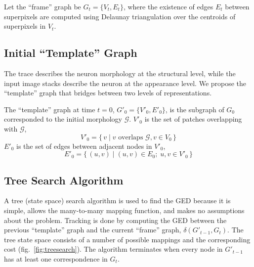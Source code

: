 \documentclass{article}
\begin{document}
Let the ``frame'' graph be $G_t = \{ V_t, E_t \}$, where the existence of edges $E_t$ between superpixels are computed using Delaunay triangulation over the centroids of superpixels in $V_t$.


\subsection{Initial ``Template'' Graph}
The trace describes the neuron morphology at the structural level, while the input image stacks describe the neuron at the appearance level. We propose the ``template'' graph that bridges between two levels of representations.

The ``template'' graph at time $t=0$, $G'_0 =  \{V'_0, E'_0 \}$, is the subgraph of $G_0$ corresponded to the initial morphology $\mathcal{G}$. $V'_0$ is the set of patches overlapping with $\mathcal{G}$, 
\begin{equation}
V'_0 = \{\,v \mid v \text{ overlaps } \mathcal{G}, v \in V_0 \,\}
\end{equation}
$E'_0$ is the set of edges between adjacent nodes in $V'_0$, 
\begin{equation}
E'_0 = \{\, (u, v) \mid (u, v) \in E_0 ;\; u, v \in V'_0 \,\}
\end{equation}


\subsection{Tree Search Algorithm} \label{sec:treealgo}
A tree (state space) search algorithm \cite{morrison2015} is used to find the GED because it is simple, allows the many-to-many mapping function, and makes no assumptions about the problem. Tracking is done by computing the GED between the previous ``template'' graph and the current ``frame'' graph, $\delta (G'_{t-1}, G_t)$. The tree state space consists of a number of possible mappings and the corresponding cost (fig.~\ref{fig:treesearch}). The algorithm terminates when every node in $G'_{t-1}$ has at least one correspondence in $G_t$.
\end{document}

